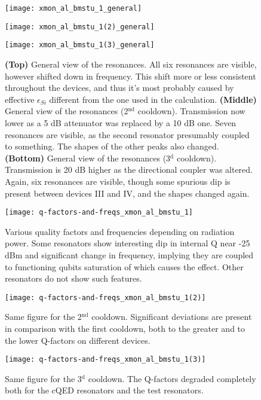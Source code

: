 \documentclass[12pt, twoside]{report}
\numberwithin{equation}{section}
\begin{document}
\begin{figure}[h!]
\centering
\texttt{[image: xmon\_al\_bmstu\_1\_general]}

\texttt{[image: xmon\_al\_bmstu\_1(2)\_general]}

\texttt{[image: xmon\_al\_bmstu\_1(3)\_general]}


\caption{\textbf{(Top)} General view of the resonances. All six resonances are visible, however shifted down in frequency. This shift more or less consistent throughout the devices, and thus it's most probably caused by effective $\epsilon_{Si}$ different from the one used in the calculation. \textbf{(Middle)} General view of the resonances (2$^\text{nd}$ cooldown). Transmission now lower as a 5 dB attenuator was replaced by a 10 dB one. Seven resonances are visible, as the second resonator presumably coupled to something. The shapes of the other peaks also changed. \textbf{(Bottom)} General view of the resonances (3$^\text{d}$ cooldown).  Transmission is 20 dB higher as the directional coupler was altered. Again, six resonances are visible, though some spurious dip is present between devices III and IV, and the shapes changed again.}
\label{fig:second_resonators_general}
\end{figure}


\begin{figure}[h!]
\centering

\texttt{[image: q-factors-and-freqs\_xmon\_al\_bmstu\_1]}

\caption{Various quality factors and frequencies depending on radiation power. Some resonators show interesting dip in internal Q near -25 dBm and significant change in frequency, implying they are coupled to functioning qubits saturation of which causes the effect. Other resonators do not show such features.}
\label{fig:second_q_factors}
\end{figure}

\begin{figure}[h!]
\centering
\texttt{[image: q-factors-and-freqs\_xmon\_al\_bmstu\_1(2)]}
\caption{Same figure for the 2$^\text{nd}$ cooldown. Significant deviations are present in comparison with the first cooldown, both to the greater and to the lower Q-factors on different devices.}
\label{fig:second_q_factors(2)}
\end{figure}

\begin{figure}[h!]
\centering
\texttt{[image: q-factors-and-freqs\_xmon\_al\_bmstu\_1(3)]}
\caption{Same figure for the 3$^\text{d}$ cooldown. The Q-factors degraded completely both for the cQED resonators and the test resonators.}
\label{fig:second_q_factors(3)}
\end{figure}
\end{document}
